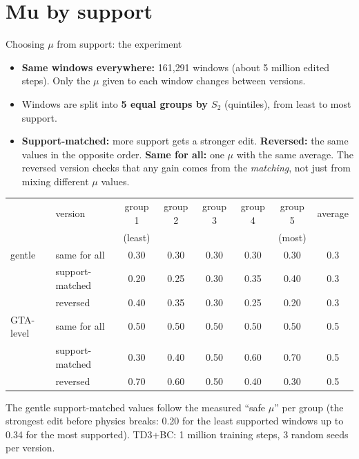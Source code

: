 \documentclass[aspectratio=169,10pt]{beamer}
\begin{document}
\section{Mu by support}
\begin{frame}[shrink=9]{Choosing $\mu$ from support: the experiment}
\begin{itemize}
\item \textbf{Same windows everywhere:} 161{,}291 windows (about 5 million edited steps). Only the $\mu$ given to each window changes between versions.
\item Windows are split into \textbf{5 equal groups by $S_2$} (quintiles), from least to most support.
\item \textbf{Support-matched:} more support gets a stronger edit. \textbf{Reversed:} the same values in the opposite order. \textbf{Same for all:} one $\mu$ with the same average. The reversed version checks that any gain comes from the \emph{matching}, not just from mixing different $\mu$ values.
\end{itemize}
\vspace{0.3em}
\centering
\begin{tabular}{llcccccc}
\toprule
 & version & group 1 & group 2 & group 3 & group 4 & group 5 & average\\
 & & (least) & & & & (most) & \\
\midrule
gentle & same for all & 0.30 & 0.30 & 0.30 & 0.30 & 0.30 & 0.3\\
 & support-matched & 0.20 & 0.25 & 0.30 & 0.35 & 0.40 & 0.3\\
 & reversed & 0.40 & 0.35 & 0.30 & 0.25 & 0.20 & 0.3\\
\midrule
GTA-level & same for all & 0.50 & 0.50 & 0.50 & 0.50 & 0.50 & 0.5\\
 & support-matched & 0.30 & 0.40 & 0.50 & 0.60 & 0.70 & 0.5\\
 & reversed & 0.70 & 0.60 & 0.50 & 0.40 & 0.30 & 0.5\\
\bottomrule
\end{tabular}
\vspace{0.3em}

\raggedright\small The gentle support-matched values follow the measured ``safe $\mu$'' per group (the strongest edit before physics breaks: 0.20 for the least supported windows up to 0.34 for the most supported). TD3+BC: 1 million training steps, 3 random seeds per version.
\end{frame}
\end{document}
